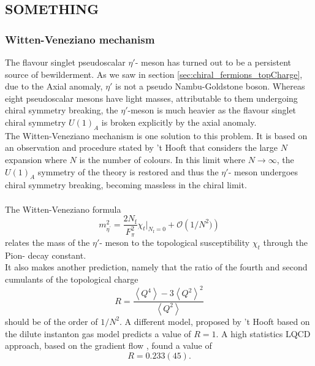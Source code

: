\documentclass[a4paper,10pt]{article}
\begin{document}
\subsection{SOMETHING}
\subsubsection{Witten-Veneziano mechanism}
The flavour singlet pseudoscalar $\eta '$- meson has turned out to be a persistent source of bewilderment. As we saw in section \ref{sec:chiral_fermions_topCharge}, due to the Axial anomaly, $\eta '$ is not a pseudo Nambu-Goldstone boson. Whereas eight pseudoscalar mesons have light masses, attributable to them undergoing chiral symmetry breaking, the $\eta '$-meson is much heavier as the flavour singlet chiral symmetry $U(1)_A$ is broken explicitly by the axial anomaly.\\
The Witten-Veneziano mechanism\cite{VenezianoG1979Uwi}\cite{WittenE1979Catf} is one solution to this problem. It is based on an observation and procedure stated by 't Hooft \cite{HOOFT1974461} that considers the large $N$ expansion where $N$ is the number of colours. In this limit where $N\rightarrow \infty$, the $U(1)_A$ symmetry of the theory is restored and thus the $\eta '$- meson undergoes chiral symmetry breaking, becoming massless in the chiral limit.\\\\ The Witten-Veneziano formula
\begin{equation}\label{eq:etaPrimeMass}
m_{\eta^{\prime}}^{2}=\frac{2 N_{\mathrm{f}}}{F_{\pi}^{2}} \chi_{t}\big|_{N_{\mathrm{f}}=0} + \mathcal{O}\left( 1/N^2) \right)
\end{equation}
relates the mass of the $\eta '$- meson to the topological susceptibility $\chi_{t}$ through the Pion- decay constant.\\It also makes another prediction, namely that the ratio of the fourth and second cumulants of the topological charge
\begin{equation}
R=\frac{\left\langle Q^{4}\right\rangle-3\left\langle Q^{2}\right\rangle^{2}}{\left\langle Q^{2}\right\rangle}
\end{equation}
should be of the order of $1/N^2$. A different model, proposed by 't Hooft based on the dilute instanton gas model predicts a value of $R=1$. A high statistics LQCD approach, based on the gradient flow \cite{non_gaussianities2015}, found a value of 
\begin{equation}
R = 0.233(45).
\end{equation}
\end{document}
